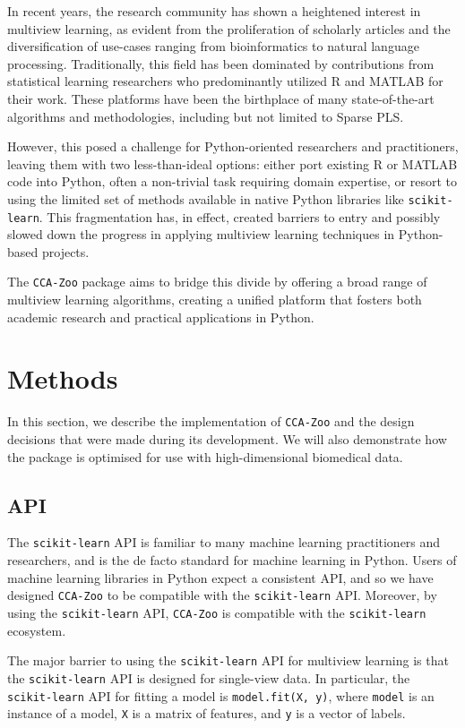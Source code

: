 In recent years, the research community has shown a heightened interest in multiview learning, as evident from the proliferation of scholarly articles and the diversification of use-cases ranging from bioinformatics to natural language processing.
Traditionally, this field has been dominated by contributions from statistical learning researchers who predominantly utilized R and MATLAB for their work.
These platforms have been the birthplace of many state-of-the-art algorithms and methodologies, including but not limited to Sparse PLS.

However, this posed a challenge for Python-oriented researchers and practitioners, leaving them with two less-than-ideal options: either port existing R or MATLAB code into Python, often a non-trivial task requiring domain expertise, or resort to using the limited set of methods available in native Python libraries like \texttt{scikit-learn}.
This fragmentation has, in effect, created barriers to entry and possibly slowed down the progress in applying multiview learning techniques in Python-based projects.

The \texttt{CCA-Zoo} package aims to bridge this divide by offering a broad range of multiview learning algorithms, creating a unified platform that fosters both academic research and practical applications in Python.

\section{Methods}

In this section, we describe the implementation of \texttt{CCA-Zoo} and the design decisions that were made during its development.
We will also demonstrate how the package is optimised for use with high-dimensional biomedical data.

\subsection{API}

The \texttt{scikit-learn} API is familiar to many machine learning practitioners and researchers, and is the de facto standard for machine learning in Python.
Users of machine learning libraries in Python expect a consistent API, and so we have designed \texttt{CCA-Zoo} to be compatible with the \texttt{scikit-learn} API.
Moreover, by using the \texttt{scikit-learn} API, \texttt{CCA-Zoo} is compatible with the \texttt{scikit-learn} ecosystem.

The major barrier to using the \texttt{scikit-learn} API for multiview learning is that the \texttt{scikit-learn} API is designed for single-view data.
In particular, the \texttt{scikit-learn} API for fitting a model is \texttt{model.fit(X, y)}, where \texttt{model} is an instance of a model, \texttt{X} is a matrix of features, and \texttt{y} is a vector of labels.

